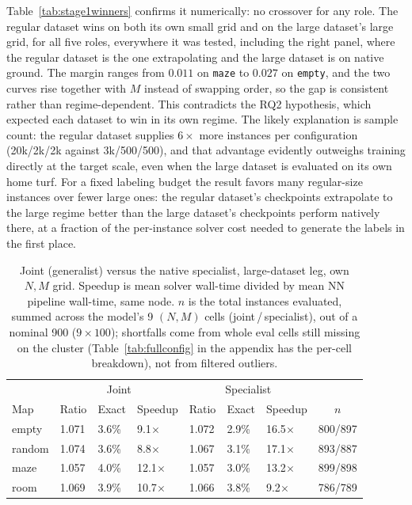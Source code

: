 \documentclass[11pt,a4paper]{article}
\begin{document}


Table~\ref{tab:stage1winners} confirms it numerically: no crossover for any role. The regular dataset wins
on both its own small grid and on the large dataset's large grid, for all five roles, everywhere it was
tested, including the right panel, where the regular dataset is the one extrapolating and the large dataset is on
native ground. The margin ranges from $0.011$ on \texttt{maze} to $0.027$ on \texttt{empty}, and
the two curves rise together with $M$ instead of swapping order, so the gap is consistent rather
than regime-dependent. This contradicts the RQ2 hypothesis, which expected each dataset to win in
its own regime. The likely explanation is sample count: the regular dataset supplies $6\times$ more
instances per configuration (20k/2k/2k against 3k/500/500), and that advantage evidently
outweighs training directly at the target scale, even when the large dataset is evaluated on its own home
turf. For a fixed labeling budget the result favors many regular-size instances over fewer large
ones: the regular dataset's checkpoints extrapolate to the large regime better than the large dataset's checkpoints
perform natively there, at a fraction of the per-instance solver cost needed to generate the
labels in the first place.

\begin{table}[htbp]
\centering
\caption{Joint (generalist) versus the native specialist, large-dataset leg, own
$N,M$ grid. Speedup is mean solver wall-time divided by mean NN pipeline wall-time, same node.
$n$ is the total instances evaluated, summed across the model's 9 $(N,M)$ cells
(joint\,/\,specialist), out of a nominal 900 ($9\times100$); shortfalls come from whole eval
cells still missing on the cluster (Table~\ref{tab:fullconfig} in the appendix has the per-cell
breakdown), not from filtered outliers.}
\small
\begin{tabularx}{\textwidth}{lXXXXXXc}
\toprule
& \multicolumn{3}{c}{Joint} & \multicolumn{3}{c}{Specialist} & \\
Map & Ratio & Exact & Speedup & Ratio & Exact & Speedup & $n$ \\
\midrule
empty  & 1.071 & 3.6\% & 9.1$\times$  & 1.072 & 2.9\% & 16.5$\times$ & 800/897 \\
random & 1.074 & 3.6\% & 8.8$\times$  & 1.067 & 3.1\% & 17.1$\times$ & 893/887 \\
maze   & 1.057 & 4.0\% & 12.1$\times$ & 1.057 & 3.0\% & 13.2$\times$ & 899/898 \\
room   & 1.069 & 3.9\% & 10.7$\times$ & 1.066 & 3.8\% & 9.2$\times$  & 786/789 \\
\bottomrule
\end{tabularx}
\label{tab:stage2diag}
\end{table}
\end{document}
